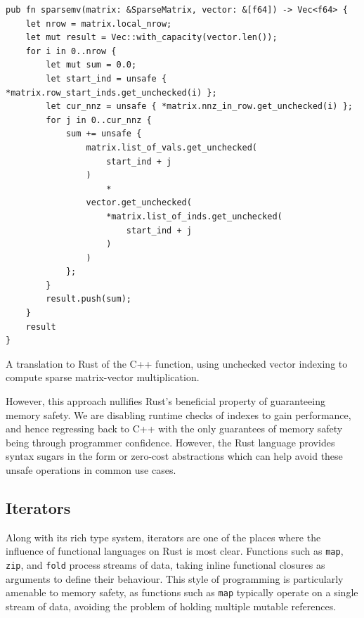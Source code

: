 \begin{listing}[H]
    \begin{verbatim}
pub fn sparsemv(matrix: &SparseMatrix, vector: &[f64]) -> Vec<f64> {
    let nrow = matrix.local_nrow;
    let mut result = Vec::with_capacity(vector.len());
    for i in 0..nrow {
        let mut sum = 0.0;
        let start_ind = unsafe { *matrix.row_start_inds.get_unchecked(i) };
        let cur_nnz = unsafe { *matrix.nnz_in_row.get_unchecked(i) };
        for j in 0..cur_nnz {
            sum += unsafe {
                matrix.list_of_vals.get_unchecked(
                    start_ind + j
                )
                    *
                vector.get_unchecked(
                    *matrix.list_of_inds.get_unchecked(
                        start_ind + j
                    )
                )
            };
        }
        result.push(sum);
    }
    result
}
    \end{verbatim}
    \caption{A translation to Rust of the C++ function, using unchecked vector indexing to compute sparse matrix-vector multiplication.}
    \label{listing:rust-sparsemv-unchecked}
\end{listing}

However, this approach nullifies Rust's beneficial property of guaranteeing memory safety. We are disabling runtime checks of indexes to gain performance, and hence regressing back to C++ with the only guarantees of memory safety being through programmer confidence. However, the Rust language provides syntax sugars in the form or zero-cost abstractions which can help avoid these unsafe operations in common use cases.

\subsection{Iterators}
\label{sec:translation-iterators}

Along with its rich type system, iterators are one of the places where the influence of functional languages on Rust is most clear. Functions such as \texttt{map}, \texttt{zip}, and \texttt{fold} process streams of data, taking inline functional closures as arguments to define their behaviour. This style of programming is particularly amenable to memory safety, as functions such as \texttt{map} typically operate on a single stream of data, avoiding the problem of holding multiple mutable references.

